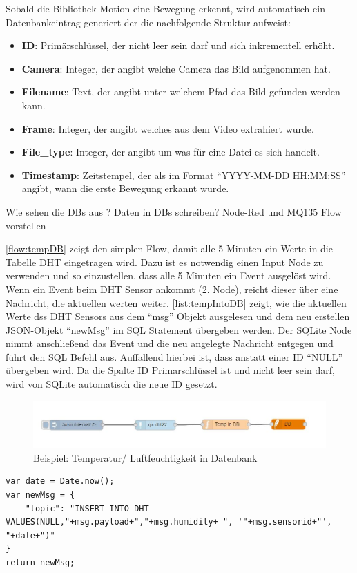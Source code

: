 Sobald die Bibliothek Motion eine Bewegung erkennt, wird automatisch ein Datenbankeintrag generiert der die nachfolgende Struktur aufweist:
\begin{itemize}
	\item \textbf{ID}: Primärschlüssel, der nicht leer sein darf und sich inkrementell erhöht.  
	\item \textbf{Camera}: Integer, der angibt welche Camera das Bild aufgenommen hat.
	\item \textbf{Filename}: Text, der angibt unter welchem Pfad das Bild gefunden werden kann.
	\item \textbf{Frame}: Integer, der angibt welches aus dem Video extrahiert wurde. 
	\item \textbf{File\_type}: Integer, der angibt um was für eine Datei es sich handelt.
	\item \textbf{Timestamp}: Zeitstempel, der als im Format \enquote{YYYY-MM-DD HH:MM:SS} angibt, wann die erste Bewegung erkannt wurde.	
\end{itemize}


Wie sehen die DBs aus ?
Daten in DBs schreiben? Node-Red und MQ135
Flow vorstellen

\autoref{flow:tempDB} zeigt den simplen Flow, damit alle 5 Minuten ein Werte in die Tabelle DHT eingetragen wird. Dazu ist es notwendig einen Input Node zu verwenden und so einzustellen, dass alle 5 Minuten ein Event ausgelöst wird. Wenn ein Event beim DHT Sensor ankommt (2. Node), reicht dieser über eine Nachricht, die aktuellen werten weiter. \autoref{list:tempIntoDB} zeigt, wie die aktuellen Werte dss DHT Sensors aus dem \enquote{msg} Objekt ausgelesen und dem neu erstellen \ac{JSON}-Objekt \enquote{newMsg} im \ac{SQL} Statement übergeben werden. Der SQLite Node nimmt anschließend das Event und die neu angelegte Nachricht entgegen und führt den \ac{SQL} Befehl  aus. Auffallend hierbei ist, dass anstatt einer ID \enquote{NULL} übergeben wird. Da die Spalte ID Primarschlüssel ist und nicht leer sein darf, wird von SQLite automatisch die neue ID gesetzt.
\begin{figure}[h]
	\centering
	\includegraphics[scale=0.7]{images/tempIntoDB}
	\caption{Beispiel: Temperatur/ Luftfeuchtigkeit in Datenbank}
	\label{flow:tempDB}
\end{figure}
\begin{lstlisting}[label=list:tempIntoDB, caption={Neuer Eintrag in Tabelle DHT}]
var date = Date.now();
var newMsg = {
	"topic": "INSERT INTO DHT VALUES(NULL,"+msg.payload+","+msg.humidity+ ", '"+msg.sensorid+"', "+date+")"
}
return newMsg;
\end{lstlisting}


